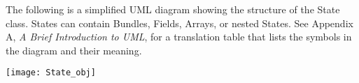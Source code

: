 

The following is a simplified UML diagram showing the structure of the
State class.  States can contain Bundles, Fields, Arrays, or nested
States.  See Appendix A, {\it A Brief Introduction to UML},
for a translation table that lists the symbols in the diagram and their 
meaning.

\begin{center}
\texttt{[image: State\_obj]}   
\end{center}
